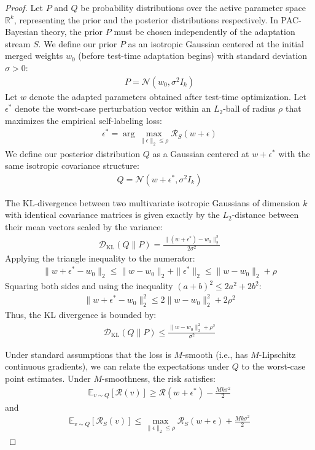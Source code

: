 \documentclass{article}
\theoremstyle{plain}
\theoremstyle{definition}
\theoremstyle{remark}
\begin{document}
\begin{proof}
Let $P$ and $Q$ be probability distributions over the active parameter space $\mathbb{R}^k$, representing the prior and the posterior distributions respectively. In PAC-Bayesian theory, the prior $P$ must be chosen independently of the adaptation stream $S$. We define our prior $P$ as an isotropic Gaussian centered at the initial merged weights $w_0$ (before test-time adaptation begins) with standard deviation $\sigma > 0$:
\begin{align}
    P = \mathcal{N}(w_0, \sigma^2 I_k)
\end{align}
Let $w$ denote the adapted parameters obtained after test-time optimization. Let $\epsilon^*$ denote the worst-case perturbation vector within an $L_2$-ball of radius $\rho$ that maximizes the empirical self-labeling loss:
\begin{align}
    \epsilon^* = \arg\max_{\|\epsilon\|_2 \le \rho} \mathcal{R}_S(w + \epsilon)
\end{align}
We define our posterior distribution $Q$ as a Gaussian centered at $w + \epsilon^*$ with the same isotropic covariance structure:
\begin{align}
    Q = \mathcal{N}(w + \epsilon^*, \sigma^2 I_k)
\end{align}

The KL-divergence between two multivariate isotropic Gaussians of dimension $k$ with identical covariance matrices is given exactly by the $L_2$-distance between their mean vectors scaled by the variance:
\begin{align}
    \mathcal{D}_{\text{KL}}(Q \parallel P) = \frac{\| (w + \epsilon^*) - w_0 \|_2^2}{2\sigma^2}
\end{align}
Applying the triangle inequality to the numerator:
\begin{align}
    \| w + \epsilon^* - w_0 \|_2 \le \| w - w_0 \|_2 + \|\epsilon^*\|_2 \le \| w - w_0 \|_2 + \rho
\end{align}
Squaring both sides and using the inequality $(a+b)^2 \le 2a^2 + 2b^2$:
\begin{align}
    \| w + \epsilon^* - w_0 \|_2^2 \le 2 \| w - w_0 \|_2^2 + 2\rho^2
\end{align}
Thus, the KL divergence is bounded by:
\begin{align}
    \mathcal{D}_{\text{KL}}(Q \parallel P) \le \frac{\|w - w_0\|_2^2 + \rho^2}{\sigma^2}
\end{align}

Under standard assumptions that the loss is $M$-smooth (i.e., has $M$-Lipschitz continuous gradients), we can relate the expectations under $Q$ to the worst-case point estimates. Under $M$-smoothness, the risk satisfies:
\begin{align}
    \mathbb{E}_{v \sim Q}[\mathcal{R}(v)] \ge \mathcal{R}(w + \epsilon^*) - \frac{M k \sigma^2}{2}
\end{align}
and
\begin{align}
    \mathbb{E}_{v \sim Q}[\mathcal{R}_S(v)] \le \max_{\|\epsilon\|_2 \le \rho} \mathcal{R}_S(w + \epsilon) + \frac{M k \sigma^2}{2}
\end{align}


\end{proof}
\end{document}
